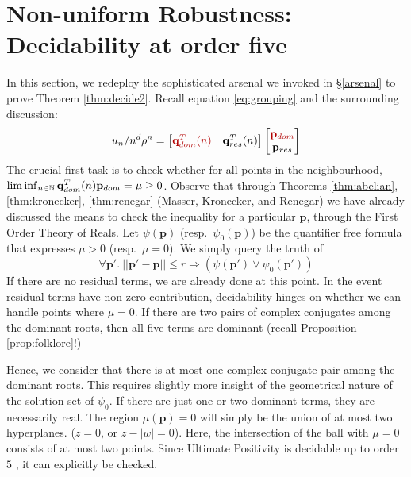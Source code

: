 \section{Non-uniform Robustness: Decidability at order five}
\label{section:decidability}
In this section, we redeploy the sophisticated arsenal we invoked in \S\ref{arsenal} to prove Theorem \ref{thm:decide2}. Recall equation \ref{eq:grouping} and the surrounding discussion:
\begin{equation}
u_n/n^d\rho^n = \begin{bmatrix}
{\color{red!70!black} \mathbf{q}_{dom}^T(n) } & \mathbf{q}_{res}^T(n)
\end{bmatrix}
\begin{bmatrix}
{\color{red!70!black} \mathbf{p}_{dom}} \\
\mathbf{p}_{res}
\end{bmatrix}
\end{equation}
The crucial first task is to check whether for all points in the neighbourhood, \\$\liminf_{n\in\mathbb{N}}\mathbf{q}_{dom}^T(n)\mathbf{p}_{dom} = \mu \ge 0$. Observe that through Theorems \ref{thm:abelian}, \ref{thm:kronecker}, \ref{thm:renegar} (Masser, Kronecker, and Renegar) we have already discussed the means to check the inequality for a particular $\mathbf{p}$, through the First Order Theory of Reals. Let $\psi(\mathbf{p})$ (resp.\ $\psi_0(\mathbf{p})$) be the quantifier free formula that expresses $\mu > 0$ (resp.\ $\mu = 0$). We simply query the truth of
\begin{equation}
\label{eq:firsttask}
\forall \mathbf{p'}.~||\mathbf{p'} - \mathbf{p}|| \le r \Rightarrow (\psi(\mathbf{p'}) \lor \psi_0(\mathbf{p'}))
\end{equation}
If there are no residual terms, we are already done at this point. In the event residual terms have non-zero contribution, decidability hinges on whether we can handle points where $\mu = 0$. If there are two pairs of complex conjugates among the dominant roots, then all five terms are dominant (recall Proposition \ref{prop:folklore}!)

Hence, we consider that there is at most one complex conjugate pair among the dominant roots. This requires slightly more insight of the geometrical nature of the solution set of $\psi_0$. If there are just one or two dominant terms, they are necessarily real. The region $\mu(\mathbf{p}) = 0$ will simply be the union of at most two hyperplanes. ($z = 0$, or $z - |w| = 0$). Here, the intersection of the ball with $\mu = 0$ consists of at most two points. Since Ultimate Positivity is decidable up to order $5$ \cite{joeljames3}, it can explicitly be checked.

